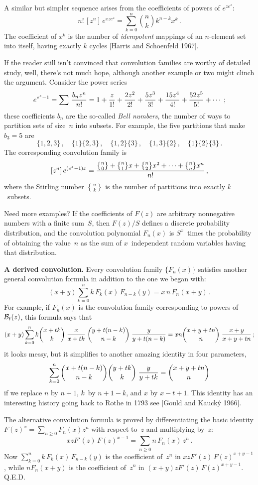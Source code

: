 A similar but simpler sequence arises from the coefficients of powers
of $e^{ze^z}$:
$$n!\,[z^n]\,e^{xze^z}=\sum_{k=0}^n{n\choose k}k^{n-k}x^k\,.$$
The coefficient of $x^k$ is the number of {\it idempotent\/} mappings
of an $n$-element set into itself, having exactly $k$ cycles
[Harris and Schoenfeld 1967].

If the reader still isn't convinced that convolution families are
worthy of detailed study, well, there's not much hope, although
another example or two might clinch the argument. Consider the power
series
$$e^{e^z-1}=\sum\,{b_nz^n\over n!}=1+{z\over 1!}+{2z^2\over
2!}+{5z^3\over 3!}+{15z^4\over 4!}+{52z^5\over 5!}+\cdots\;;$$
these coefficients $b_n$ are the so-called {\it Bell numbers}, the
number of ways to partition sets of size~$n$ into subsets. For
example, the five partitions that make $b_3=5$ are
$$\{1,2,3\}\,,\quad \{1\}\{2,3\}\,,\quad
\{1,2\}\{3\}\,,\quad\{1,3\}\{2\}\,,\quad \{1\}\{2\}\{3\}\,.$$
The corresponding convolution family is
$$[z^n]\,e^{(e^z-1)x}={{n\brace 0}+{n\brace 1}x+{n\brace
2}x^2+\cdots +{n\brace n}x^n\over n!}\,,$$
where the Stirling number ${n\brace k}$ is the number of partitions
into exactly $k$~subsets.

Need more examples? If the coefficients of $F(z)$ are arbitrary nonnegative
numbers with a finite sum~$S$, then $F(z)/S$ defines a discrete
probability distribution, and the convolution polynomial $F_n(x)$ is
$S^x$~times the probability of obtaining the value~$n$ as the sum of
$x$~independent random variables having that distribution.

\bn
{\bf A derived convolution.}\enspace
Every convolution family $\{F_n(x)\}$ satisfies another general
convolution formula in addition to the one we began with:
$$(x+y)\sum_{k=0}^nk\,F_k(x)\,F_{n-k}(y)=x\,n\,F_n(x+y)\,.$$
For example, if $F_n(x)$ is the convolution family corresponding to
powers of ${\cal B}_t(z)$, this formula says that
$$(x+y)\sum_{k=0}^nk{x+tk\choose k}\;{x\over x+tk}\;{y+t(n-k)\choose
n-k}\;{y\over y+t(n-k)}=xn{x+y+tn\choose n}\;{x+y\over x+y+tn}\,;$$
it looks messy, but it simplifies to another amazing identity in four
parameters,
$$\sum_{k=0}^n{x+t(n-k)\choose n-k}{y+tk\choose k}\;{y\over
y+tk}={x+y+tn\choose n}$$
if we replace $n$ by $n+1$, $k$~by $n+1-k$, and $x$ by $x-t+1$. This
identity  has an interesting history going back to Rothe in 1793
see
[Gould and Kauck\'y 1966].

The alternative convolution formula is proved by differentiating the
basic identity $F(z)^x=\sum_{n\geq 0}F_n(x)z^n$ with respect to~$z$ and
multiplying by~$z$:
$$xzF'(z)\,F(z)^{x-1}=\sum_{n\geq 0}n\,F_n(x)\,z^n\,.$$
Now $\sum_{k=0}^n k\,F_k(x)\,F_{n-k}(y)$ is the coefficient of~$z^n$ in
$xzF'(z)\,F(z)^{x+y-1}$, while $nF_n(x+y)$ is the coefficient of~$z^n$
in $(x+y)zF'(z)\,F(z)^{x+y-1}$.
Q.E.D.

